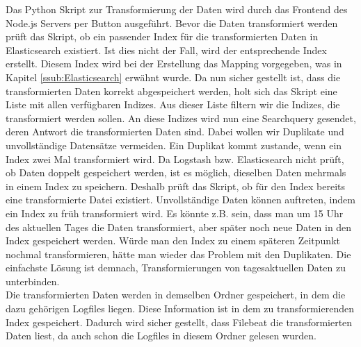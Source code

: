 
Das Python Skript zur Transformierung der Daten wird durch das Frontend des Node.js Servers per Button ausgeführt. Bevor die Daten transformiert werden prüft das Skript, ob ein passender Index für die transformierten Daten in Elasticsearch existiert. Ist dies nicht der Fall, wird der entsprechende Index erstellt. Diesem Index wird bei der Erstellung das Mapping vorgegeben, was in Kapitel \ref{ssub:Elasticsearch} erwähnt wurde. Da nun sicher gestellt ist, dass die transformierten Daten korrekt abgespeichert werden, holt sich das Skript eine Liste mit allen verfügbaren Indizes. Aus dieser Liste filtern wir die Indizes, die transformiert werden sollen. An diese Indizes wird nun eine Searchquery gesendet, deren Antwort die transformierten Daten sind. Dabei wollen wir Duplikate und unvollständige Datensätze vermeiden. Ein Duplikat kommt zustande, wenn ein Index zwei Mal transformiert wird. Da Logstash bzw. Elasticsearch nicht prüft, ob Daten doppelt gespeichert werden, ist es möglich, dieselben Daten mehrmals in einem Index zu speichern. Deshalb prüft das Skript, ob für den Index bereits eine transformierte Datei existiert. Unvollständige Daten können auftreten, indem ein Index zu früh transformiert wird. Es könnte z.B. sein, dass man um 15 Uhr des aktuellen Tages die Daten transformiert, aber später noch neue Daten in den Index gespeichert werden. Würde man den Index zu einem späteren Zeitpunkt nochmal transformieren, hätte man wieder das Problem mit den Duplikaten. Die einfachste Lösung ist demnach, Transformierungen von tagesaktuellen Daten zu unterbinden.\\
Die transformierten Daten werden in demselben Ordner gespeichert, in dem die dazu gehörigen Logfiles liegen. Diese Information ist in dem zu transformierenden Index gespeichert. Dadurch wird sicher gestellt, dass Filebeat die transformierten Daten liest, da auch schon die Logfiles in diesem Ordner gelesen wurden.


